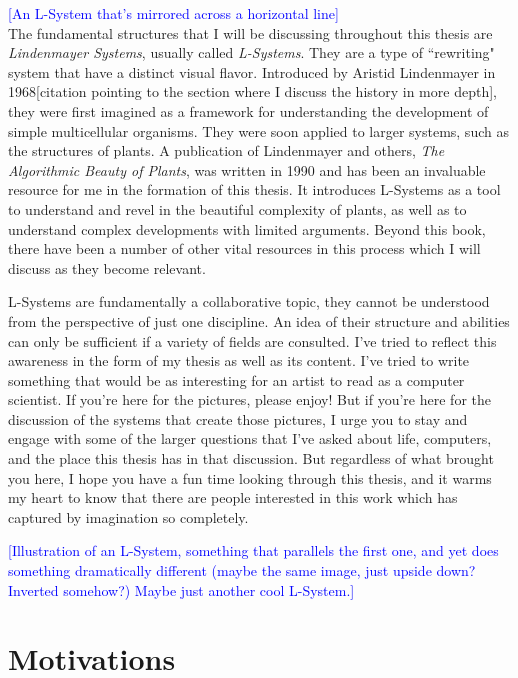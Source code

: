 \documentclass[12pt,twoside]{reedthesis}
\begin{document}
\textcolor{blue}{[An L-System that's mirrored across a horizontal line]}\\

The fundamental structures that I will be discussing throughout this thesis are \textit{Lindenmayer Systems}, usually called \textit{L-Systems}. They are a type of ``rewriting" system that have a distinct visual flavor. Introduced by Aristid Lindenmayer in 1968[citation pointing to the section where I discuss the history in more depth], they were first imagined as a framework for understanding the development of simple multicellular organisms. They were soon applied to larger systems, such as the structures of plants. A publication of Lindenmayer and others, \textit{The Algorithmic Beauty of Plants}, was written in 1990 and has been an invaluable resource for me in the formation of this thesis. It introduces L-Systems as a tool to understand and revel in the beautiful complexity of plants, as well as to understand complex developments with limited arguments. Beyond this book, there have been a number of other vital resources in this process which I will discuss as they become relevant.

L-Systems are fundamentally a collaborative topic, they cannot be understood from the perspective of just one discipline. An idea of their structure and abilities can only be sufficient if a variety of fields are consulted. I've tried to reflect this awareness in the form of my thesis as well as its content. I've tried to write something that would be as interesting for an artist to read as a computer scientist. If you're here for the pictures, please enjoy! But if you're here for the discussion of the systems that create those pictures, I urge you to stay and engage with some of the larger questions that I've asked about life, computers, and the place this thesis has in that discussion. But regardless of what brought you here, I hope you have a fun time looking through this thesis, and it warms my heart to know that there are people interested in this work which has captured by imagination so completely.


\textcolor{blue}{[Illustration of an L-System, something that parallels the first one, and yet does something dramatically different (maybe the same image, just upside down? Inverted somehow?) Maybe just another cool L-System.]}

\section{Motivations}
\end{document}
